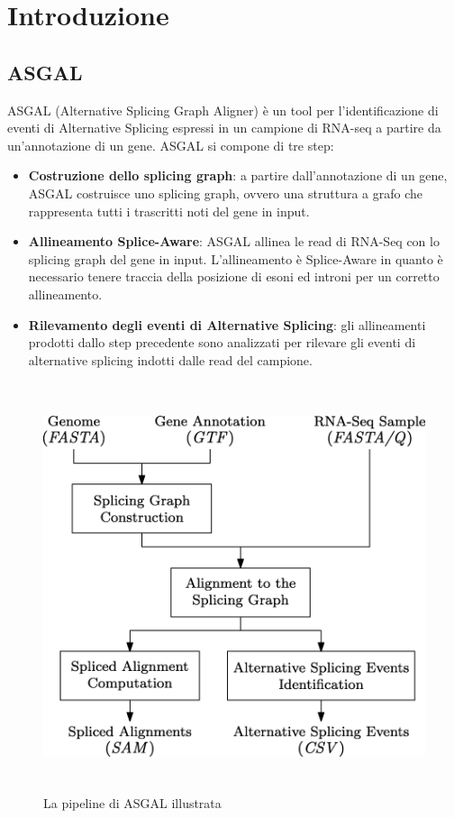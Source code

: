 \section{Introduzione}
\subsection{ASGAL}
ASGAL (Alternative Splicing Graph Aligner) è un tool per l'identificazione di eventi di Alternative Splicing espressi in un campione di RNA-seq a partire
da un'annotazione di un gene. ASGAL si compone di tre step:

\begin{itemize}
	\item \textbf{Costruzione dello splicing graph}: a partire dall'annotazione di un gene, ASGAL costruisce uno splicing graph, ovvero una struttura a grafo che rappresenta tutti i trascritti noti del gene in input.
	\item \textbf{Allineamento Splice-Aware}: ASGAL allinea le read di RNA-Seq con lo splicing graph del gene in input. L'allineamento è Splice-Aware in quanto è necessario tenere traccia della posizione di esoni ed introni per un corretto allineamento.
	\item \textbf{Rilevamento degli eventi di Alternative Splicing}: gli allineamenti prodotti dallo step precedente sono analizzati per rilevare gli eventi di alternative splicing indotti dalle read del campione.
\end{itemize}


\begin{figure}[h!]
	\includegraphics[height=12cm,width=\textwidth]{images/asgal.png}
  \caption{La pipeline di ASGAL illustrata}
  \label{fig:ASGAL}
\end{figure}
